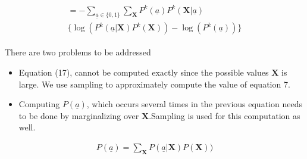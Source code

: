 \documentclass[10pt,twocolumn,letterpaper]{article}
\begin{document}
\begin{align}
\begin{split}
 = -\sum_{\underline{a}\in\lbrace 0 ,1 \rbrace} \sum_{\textbf{X}} P^{k}( \underline{a})  P^{k}(\textbf{X}| \underline{a}) \\ \Big\lbrace\log(P^{k}( \underline{a}|\textbf{X})P^{k}(\textbf{X})) - \log(P^{k}( \underline{a}))\Big\rbrace
\end{split}
\end{align}

There are two problems to be addressed
\begin{itemize}

\item{Equation (17), cannot be computed exactly since the possible values $\textbf{X}$ is large. We use sampling to approximately compute the value of equation 7.}

\item{Computing $P( \underline{a})$, which occurs several times in the previous equation needs to be done by marginalizing over $\textbf{X}$.Sampling is used for this computation as well.} 
\end{itemize}

\begin{align}
 P(\underline{a}) = \sum_{\textbf{X}}P( \underline{a}|\textbf{X})P(\textbf{X}))
\end{align}
\end{document}
